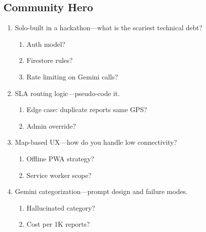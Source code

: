 \documentclass[9pt,a4paper]{article}
\begin{document}
\subsection{Community Hero}
\begin{enumerate}[label=\textbf{Q\arabic*:}, leftmargin=*]
  \item Solo-built in a hackathon---what is the scariest technical debt?
  \begin{enumerate}[label=\textit{FU\arabic*:}, leftmargin=2em]
    \item Auth model?
    \item Firestore rules?
    \item Rate limiting on Gemini calls?
  \end{enumerate}
  \item SLA routing logic---pseudo-code it.
  \begin{enumerate}[label=\textit{FU\arabic*:}, leftmargin=2em]
    \item Edge case: duplicate reports same GPS?
    \item Admin override?
  \end{enumerate}
  \item Map-based UX---how do you handle low connectivity?
  \begin{enumerate}[label=\textit{FU\arabic*:}, leftmargin=2em]
    \item Offline PWA strategy?
    \item Service worker scope?
  \end{enumerate}
  \item Gemini categorization---prompt design and failure modes.
  \begin{enumerate}[label=\textit{FU\arabic*:}, leftmargin=2em]
    \item Hallucinated category?
    \item Cost per 1K reports?
  \end{enumerate}
\end{enumerate}
\end{document}
